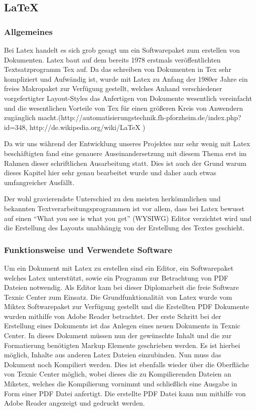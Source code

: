  \subsection{LaTeX} 

\subsubsection{Allgemeines}
Bei Latex handelt es sich grob gesagt um ein Softwarepaket zum erstellen von Dokumenten. Latex baut auf dem bereits 1978 erstmals veröffentlichten Textsatzprogramm Tex auf. Da das schreiben von Dokumenten in Tex sehr kompliziert und Aufwändig ist, wurde mit Latex zu Anfang der 1980er Jahre ein freies Makropaket zur Verfügung gestellt, welches Anhand verschiedener vorgefertigter Layout-Styles das Anfertigen von Dokumente wesentlich vereinfacht und die wesentlichen Vorteile von Tex für einen größeren Kreis von Anwendern zugänglich macht.(http://automatisierungstechnik.fh-pforzheim.de/index.php?id=348, http://de.wikipedia.org/wiki/LaTeX )

Da wir uns während der Entwicklung unseres Projektes nur sehr wenig mit Latex beschäftigten fand eine genauere Auseinandersetzung mit diesem Thema erst im Rahmen dieser schriftlichen Ausarbeitung statt. Dies ist auch der Grund warum dieses Kapitel hier sehr genau bearbeitet wurde und daher auch etwas umfangreicher Ausfällt.

Der wohl gravierendste Unterschied zu den meisten herkömmlichen und bekannten Textverarbeitungsprogrammen ist vor allem, dass bei Latex bewusst auf einen “What you see is what you get” (WYSIWG) Editor verzichtet wird und die Erstellung des Layouts unabhängig von der Erstellung des Textes geschieht.
\subsubsection{Funktionsweise und Verwendete Software}
Um ein Dokument mit Latex zu erstellen sind ein Editor, ein Softwarepaket welches Latex unterstützt, sowie ein Programm zur Betrachtung von PDF Dateien notwendig. Als Editor kam bei dieser Diplomarbeit die freie Software Texnic Center zum Einsatz. Die Grundfunktionalität von Latex wurde vom Miktex Softwarepaket zur Verfügung gestellt und die Erstellten PDF Dokumente wurden mithilfe von Adobe Reader betrachtet.
Der erste Schritt bei der Erstellung eines Dokuments ist das Anlegen eines neuen Dokuments in Texnic Center. In dieses Dokument müssen nun der gewünschte Inhalt und die zur Formatierung benötigten Markup Elemente geschrieben werden. Es ist hierbei möglich, Inhalte aus anderen Latex Dateien einzubinden.
Nun muss das Dokument noch Kompiliert werden. Dies ist ebenfalls wieder über die Oberfläche von Texnic Center möglich, wobei dieses die zu Kompilierenden Dateien an Miketex, welches die Kompilierung vornimmt und schließlich eine Ausgabe in Form einer PDF Datei anfertigt.
Die erstellte PDF Datei kann nun mithilfe von Adobe Reader angezeigt und gedruckt werden.
